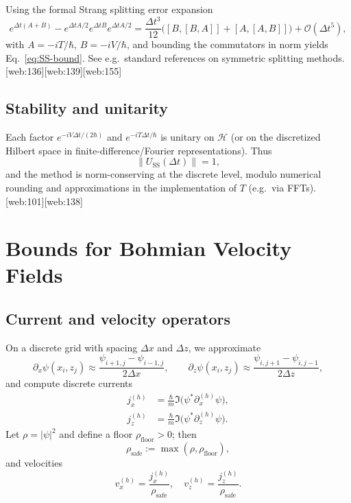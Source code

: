 \documentclass[11pt]{article}
\begin{document}
\begin{itemize}[leftmargin=*]
\begin{sketchproof}
Using the formal Strang splitting error expansion
\[
e^{\Delta t(A+B)} - e^{\Delta t A/2}e^{\Delta t B}e^{\Delta t A/2}
= \frac{\Delta t^3}{12}\big([B,[B,A]] + [A,[A,B]]\big) + \mathcal{O}(\Delta t^5),
\]
with \(A=-iT/\hbar\), \(B=-iV/\hbar\), and bounding the commutators in norm yields Eq.~\eqref{eq:SS-bound}.
See e.g.\ standard references on symmetric splitting methods.\,[web:136][web:139][web:155]
\end{sketchproof}

\subsection{Stability and unitarity}

Each factor \(e^{-iV\Delta t/(2\hbar)}\) and \(e^{-iT\Delta t/\hbar}\) is unitary on \(\mathcal{H}\) (or on the discretized Hilbert space in finite-difference/Fourier representations).
Thus
\[
\|U_{\text{SS}}(\Delta t)\|=1,
\]
and the method is norm-conserving at the discrete level, modulo numerical rounding and approximations in the implementation of \(T\) (e.g.\ via FFTs).\,[web:101][web:138]

\section{Bounds for Bohmian Velocity Fields}

\subsection{Current and velocity operators}

On a discrete grid with spacing \(\Delta x\) and \(\Delta z\), we approximate
\[
\partial_x\psi(x_i,z_j) \approx \frac{\psi_{i+1,j}-\psi_{i-1,j}}{2\Delta x},\qquad
\partial_z\psi(x_i,z_j) \approx \frac{\psi_{i,j+1}-\psi_{i,j-1}}{2\Delta z},
\]
and compute discrete currents
\begin{align}
j_x^{(h)} &= \frac{\hbar}{m}\Im\big(\psi^* \partial_x^{(h)}\psi\big),\\
j_z^{(h)} &= \frac{\hbar}{m}\Im\big(\psi^* \partial_z^{(h)}\psi\big).
\end{align}
Let \(\rho = |\psi|^2\) and define a floor \(\rho_{\mathrm{floor}}>0\); then
\[
\rho_{\mathrm{safe}} := \max(\rho,\rho_{\mathrm{floor}}),
\]
and velocities
\[
v_x^{(h)} = \frac{j_x^{(h)}}{\rho_{\mathrm{safe}}},\quad
v_z^{(h)} = \frac{j_z^{(h)}}{\rho_{\mathrm{safe}}}.
\]


\end{itemize}
\end{document}
